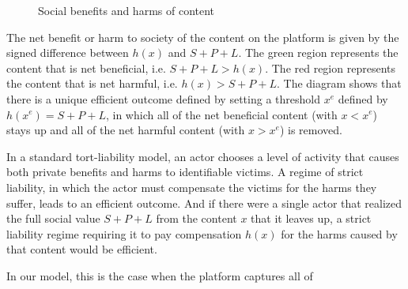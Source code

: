 \begin{figure}[h]
    \centering
{}
    \caption{Social benefits and harms of content}
    \label{fig:removal}
\end{figure}


The net benefit or harm to society of the content on the platform is given by the signed difference between $h(x)$ and $S+P+L$. The green region represents the content that is net beneficial, i.e. $S+P+L > h(x)$. The red region represents the content that is net harmful, i.e. $h(x) > S+P+L$. The diagram shows that there is a unique efficient outcome defined by setting a threshold $x^e$ defined by $h(x^e) = S + P + L$, in which all of the net beneficial content (with $x < x^e$) stays up and all of the net harmful content (with $x > x^e$) is removed.

In a standard tort-liability model, an actor chooses a level of activity that causes both private benefits and harms to identifiable victims. A regime of strict liability, in which the actor must compensate the victims for the harms they suffer, leads to an efficient outcome. And if there were a single actor that realized the full social value $S + P +L$ from the content $x$ that it leaves up, a strict liability regime requiring it to pay compensation $h(x)$ for the harms caused by that content would be efficient. 

In our model, this is the case when the platform captures all of 





